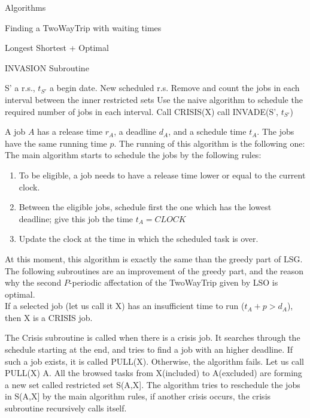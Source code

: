 \documentclass[a4paper,10pt]{report}
\begin{document}
\begin{chapter}{Algorithms}
\begin{section}{Finding a TwoWayTrip with waiting times}
\begin{subsection}{Longest Shortest + Optimal}
 \begin{algorithm}[H]
\caption{INVASION Subroutine}
\begin{algorithmic}
\REQUIRE S' a r.s., $t_{S'}$ a begin date.
\ENSURE New scheduled r.s.
\STATE Remove and count the jobs in each interval between the inner restricted sets
\STATE Use the naive algorithm to schedule the required number of jobs in each interval.
\STATE Call CRISIS(X)
\ELSE
{}
\STATE call INVADE(S', $t_{S'}$)
\ENDIF
\ENDIF
\ENDWHILE

\end{algorithmic}
\end{algorithm}


A job $A$ has a release time $r_A$, a deadline $d_A$, and a schedule time $t_A$. The jobs have the same running time $p$.
The running of this algorithm is the following one:
The main algorithm starts to schedule the jobs by the following rules:

\begin{enumerate}
 \item To be eligible, a job needs to have a release time lower or equal to the current clock.
 \item Between the eligible jobs, schedule first the one which has the lowest deadline; give this job the time $t_A = CLOCK$
 \item Update the clock at the time in which the scheduled task is over.
\end{enumerate}
At this moment, this algorithm is exactly the same than the greedy part of LSG. The following subroutines are an improvement of the greedy part, and the reason why the second $P$-periodic affectation of the TwoWayTrip given by LSO is optimal.\\


If a selected job (let us call it X) has an insufficient time to run ($t_A + p > d_A$), then X is a CRISIS job.

The Crisis subroutine is called when there is a crisis job. It searches through the schedule starting at the end,
and tries to find a job with an higher deadline.
If such a job exists, it is called PULL(X). Otherwise, the algorithm fails.
Let us call PULL(X) A.
All the browsed tasks from X(included) to A(excluded) are forming a new set called restricted set S(A,X].
The algorithm tries to reschedule the jobs in S(A,X] by the main algorithm rules, if another crisis occurs, the crisis subroutine recursively calls
itself.


\end{subsection}
\end{section}
\end{chapter}
\end{document}
